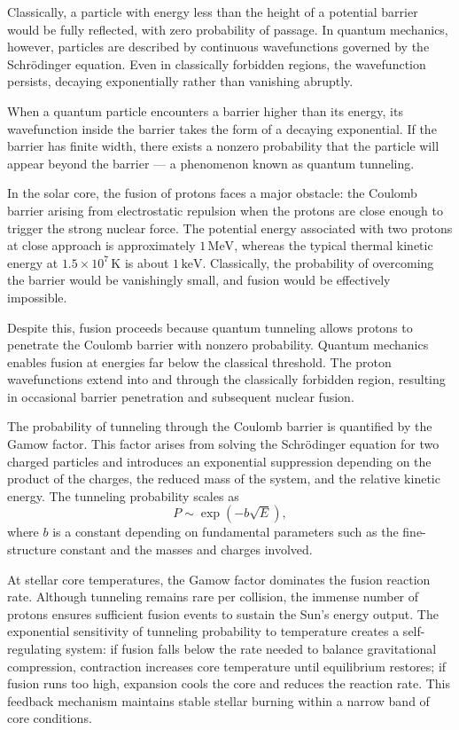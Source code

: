 Classically, a particle with energy less than the height of a potential barrier would be fully reflected, with zero probability of passage. In quantum mechanics, however, particles are described by continuous wavefunctions governed by the Schrödinger equation. Even in classically forbidden regions, the wavefunction persists, decaying exponentially rather than vanishing abruptly.

When a quantum particle encounters a barrier higher than its energy, its wavefunction inside the barrier takes the form of a decaying exponential. If the barrier has finite width, there exists a nonzero probability that the particle will appear beyond the barrier — a phenomenon known as quantum tunneling.

In the solar core, the fusion of protons faces a major obstacle: the Coulomb barrier arising from electrostatic repulsion when the protons are close enough to trigger the strong nuclear force. The potential energy associated with two protons at close approach is approximately $1\,\text{MeV}$, whereas the typical thermal kinetic energy at $1.5 \times 10^7\,\text{K}$ is about $1\,\text{keV}$. Classically, the probability of overcoming the barrier would be vanishingly small, and fusion would be effectively impossible.

Despite this, fusion proceeds because quantum tunneling allows protons to penetrate the Coulomb barrier with nonzero probability. Quantum mechanics enables fusion at energies far below the classical threshold. The proton wavefunctions extend into and through the classically forbidden region, resulting in occasional barrier penetration and subsequent nuclear fusion.

The probability of tunneling through the Coulomb barrier is quantified by the Gamow factor. This factor arises from solving the Schrödinger equation for two charged particles and introduces an exponential suppression depending on the product of the charges, the reduced mass of the system, and the relative kinetic energy. The tunneling probability scales as
\[
P \sim \exp\left( -b\sqrt{E} \right),
\]
where \( b \) is a constant depending on fundamental parameters such as the fine-structure constant and the masses and charges involved.

At stellar core temperatures, the Gamow factor dominates the fusion reaction rate. Although tunneling remains rare per collision, the immense number of protons ensures sufficient fusion events to sustain the Sun's energy output. The exponential sensitivity of tunneling probability to temperature creates a self-regulating system: if fusion falls below the rate needed to balance gravitational compression, contraction increases core temperature until equilibrium restores; if fusion runs too high, expansion cools the core and reduces the reaction rate. This feedback mechanism maintains stable stellar burning within a narrow band of core conditions.

